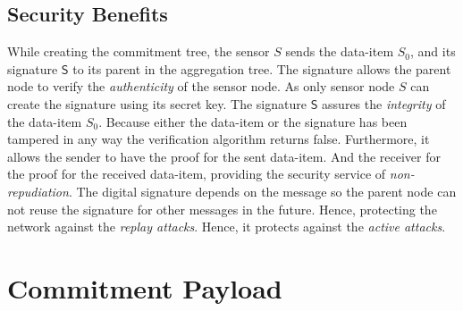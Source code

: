 	\subsection{Security Benefits}
		\label{subsec:security benefits of signing the data-item}
		While creating the commitment tree, the sensor $S$ sends the data-item $S_{0}$, and its signature $\textsf{S}$ to its parent in the aggregation tree.
		The signature allows the parent node to verify the \textit{authenticity} of the sensor node.
		As only sensor node $S$ can create the signature using its secret key. 
		The signature $\textsf{S}$ assures the \textit{integrity} of the data-item $S_{0}$.
		Because either the data-item or the signature has been tampered in any way the verification algorithm returns false.
		Furthermore, it allows the sender to have the proof for the sent data-item.
		And the receiver for the proof for the received data-item, providing the security service of \textit{non-repudiation}.
		The digital signature depends on the message so the parent node can not reuse the signature for other messages in the future.
		Hence, protecting the network against the \textit{replay attacks}.
		Hence, it protects against the \textit{active attacks}.

\section{Commitment Payload}

